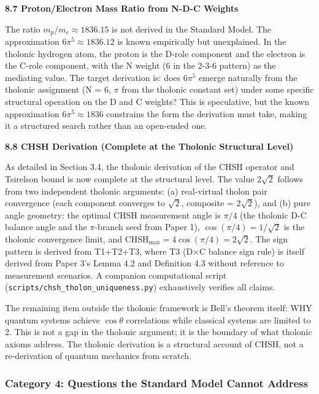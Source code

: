 \documentclass[12pt]{article}
\begin{document}
\textbf{8.7 Proton/Electron Mass Ratio from N-D-C Weights}

The ratio \(m_p/m_e \approx 1836.15\) is not derived in the Standard
Model. The approximation \(6\pi^5 \approx 1836.12\) is known empirically
but unexplained. In the tholonic hydrogen atom, the proton is the D-role
component and the electron is the C-role component, with the N weight (6
in the 2-3-6 pattern) as the mediating value. The target derivation is:
does \(6\pi^5\) emerge naturally from the tholonic assignment (N = 6,
\(\pi\) from the tholonic constant set) under some specific structural
operation on the D and C weights? This is speculative, but the known
approximation \(6\pi^5 \approx 1836\) constrains the form the derivation
must take, making it a structured search rather than an open-ended one.

\textbf{8.8 CHSH Derivation (Complete at the Tholonic Structural Level)}

As detailed in Section 3.4, the tholonic derivation of the CHSH operator
and Tsirelson bound is now complete at the structural level. The value
\(2\sqrt{2}\) follows from two independent tholonic arguments: (a)
real-virtual tholon pair convergence (each component converges to
\(\sqrt{2}\), composite = \(2\sqrt{2}\)), and (b) pure angle geometry:
the optimal CHSH measurement angle is \(\pi/4\) (the tholonic D-C
balance angle and the \(\pi\)-branch seed from Paper 1),
\(\cos(\pi/4) = 1/\sqrt{2}\) is the tholonic convergence limit, and
\(\mathrm{CHSH}_{\max} = 4\cos(\pi/4) = 2\sqrt{2}\). The sign pattern is
derived from T1+T2+T3, where T3 (D\(\times\)C balance sign rule) is
itself derived from Paper 3's Lemma 4.2 and Definition 4.3 without
reference to measurement scenarios. A companion computational script
(\texttt{scripts/chsh\_tholon\_uniqueness.py}) exhaustively verifies all
claims.

The remaining item outside the tholonic framework is Bell's theorem
itself: WHY quantum systems achieve \(\cos\theta\) correlations while
classical systems are limited to 2. This is not a gap in the tholonic
argument; it is the boundary of what tholonic axioms address. The
tholonic derivation is a structural account of CHSH, not a re-derivation
of quantum mechanics from scratch.

\subsubsection{Category 4: Questions the Standard Model Cannot
Address}\label{category-4-questions-the-standard-model-cannot-address}
\end{document}
